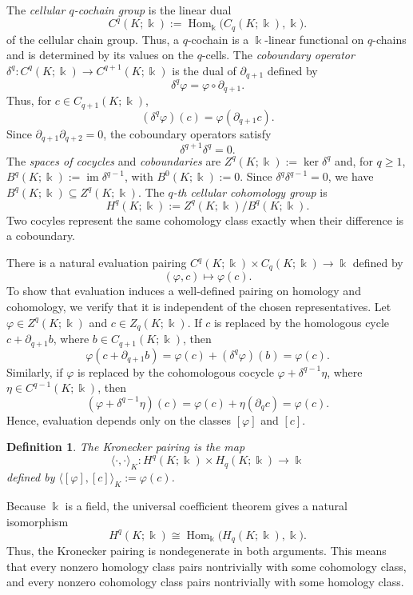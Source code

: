 \documentclass[11pt]{article}
\theoremstyle{paperdefinition}
\newtheorem{definition}{Definition}[section]
\theoremstyle{paperplain}
\theoremstyle{paperremark}
\begin{document}
The \emph{cellular $q$-cochain group} is the linear dual
\[
C^q(K;\Bbbk) := \operatorname{Hom}_{\Bbbk}\bigl(C_q(K;\Bbbk),\Bbbk\bigr).
\]
of the cellular chain group. Thus, a $q$-cochain is a $\Bbbk$-linear functional on $q$-chains and is determined by its values on the $q$-cells. The \emph{coboundary operator} $\delta^q:C^q(K;\Bbbk)\longrightarrow C^{q+1}(K;\Bbbk)$ is the dual of $\partial_{q+1}$ defined by
\[
\delta^q\varphi = \varphi\circ\partial_{q+1}.
\]
Thus, for $c\in C_{q+1}(K;\Bbbk)$,
\[
(\delta^q\varphi)(c)=\varphi(\partial_{q+1}c).
\]
Since $\partial_{q+1}\partial_{q+2} = 0$, the coboundary operators satisfy
\[
\delta^{q+1}\delta^q=0.
\]
The \emph{spaces of cocycles} and \emph{coboundaries} are $Z^q(K;\Bbbk):=\ker\delta^q$ and, for $q \geq 1$, $B^q(K;\Bbbk):=\operatorname{im}\delta^{q-1}$, with $B^0(K;\Bbbk) := 0$. Since $\delta^q\delta^{q-1} = 0$, we have $B^q(K;\Bbbk) \subseteq Z^q(K;\Bbbk)$. The \emph{$q$-th cellular cohomology group} is
\[
H^q(K;\Bbbk) := Z^q(K;\Bbbk)/B^q(K;\Bbbk).
\]
Two cocyles represent the same cohomology class exactly when their difference is a coboundary.

There is a natural evaluation pairing $C^q(K;\Bbbk)\times C_q(K;\Bbbk)\longrightarrow\Bbbk$ defined by 
\[
(\varphi,c)\longmapsto\varphi(c).
\]
To show that evaluation induces a well-defined pairing on homology and cohomology, we verify that it is independent of the chosen representatives. Let $\varphi \in Z^q(K;\Bbbk)$ and $c \in Z_q(K;\Bbbk)$. If $c$ is replaced by the homologous cycle $c+\partial_{q+1}b$, where $b \in C_{q+1}(K;\Bbbk)$, then
\[
\varphi(c+\partial_{q+1}b) = \varphi(c)+(\delta^q\varphi)(b) = \varphi(c).
\]
Similarly, if $\varphi$ is replaced by the cohomologous cocycle $\varphi+\delta^{q-1}\eta$, where $\eta \in C^{q-1}(K;\Bbbk)$, then
\[
(\varphi+\delta^{q-1}\eta)(c) = \varphi(c)+\eta(\partial_qc) = \varphi(c).
\]
Hence, evaluation depends only on the classes $[\varphi]$ and $[c]$.

\begin{definition}
\label{def:kronecker-pairing}
The \emph{Kronecker pairing} is the map
\[
\langle\cdot,\cdot\rangle_K:
H^q(K;\Bbbk)\times H_q(K;\Bbbk)
\longrightarrow\Bbbk
\]
defined by $\langle[\varphi],[c]\rangle_K:=\varphi(c)$.
\end{definition}

Because $\Bbbk$ is a field, the universal coefficient theorem gives a natural
isomorphism \cite{hatcher2002algebraic}
\[
H^q(K;\Bbbk) \cong \operatorname{Hom}_{\Bbbk}\bigl(H_q(K;\Bbbk),\Bbbk\bigr).
\]
Thus, the Kronecker pairing is nondegenerate in both arguments. This means that every nonzero homology class pairs nontrivially with some cohomology class, and every nonzero cohomology class pairs nontrivially with some homology class. 
\end{document}
